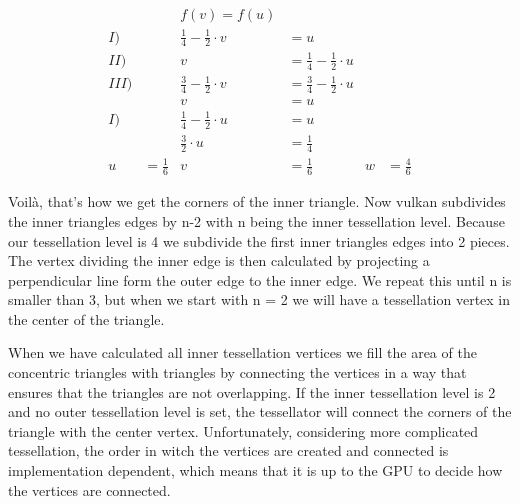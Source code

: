 \documentclass[12pt]{report} \usepackage{preamble}
\begin{document}
\[
	\begin{aligned}
		     &               & f(v)= f(u)                                                                                \\
		I)   &               & \frac{1}{4} - \frac{1}{2}\cdot v & = u                                                    \\
		II)  &               & v                                & = \frac{1}{4} - \frac{1}{2}\cdot u                     \\
		III) &               & \frac{3}{4} -\frac{1}{2}\cdot v  & = \frac{3}{4} -\frac{1}{2}\cdot u                      \\
		     &               & v                                & = u                                                    \\
		I)   &               & \frac{1}{4} - \frac{1}{2}\cdot u & = u                                                    \\
		     &               & \frac{3}{2}\cdot u               & = \frac{1}{4}                                          \\
		u    & = \frac{1}{6} & v                                & = \frac{1}{6}                      & w & = \frac{4}{6}
	\end{aligned}
\]

Voil\`a, that's how we get the corners of the inner triangle. Now vulkan subdivides the inner triangles edges by n-2 with n being the
inner tessellation level. Because our tessellation level is 4 we subdivide the first inner triangles edges into 2
pieces. The vertex dividing the inner edge is then calculated by projecting a perpendicular line form the outer edge to the inner edge.
We repeat this until n is smaller than 3, but when we start with n = 2 we will have a tessellation vertex in the center of the
triangle. \cite{tessellation}

When we have calculated all inner tessellation vertices we fill the area of the concentric triangles with triangles by
connecting the vertices in a way that ensures that the triangles are not overlapping. If the inner tessellation level is 2 and
no outer tessellation level is set, the tessellator will connect the corners of the triangle with the center vertex. \cite{tessellation}
Unfortunately, considering more complicated tessellation, the order in witch the vertices are created and connected is implementation dependent,
which means that it is up to the GPU to decide how the vertices are connected. \cite{tessellation}
\end{document}
